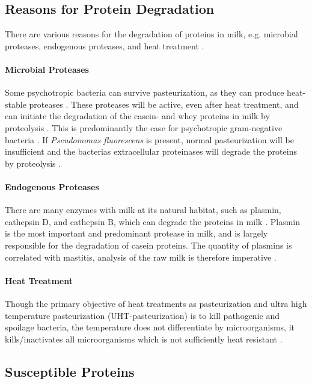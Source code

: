 \subsection{Reasons for Protein Degradation}
There are various reasons for the degradation of proteins in milk, e.g. microbial proteases, endogenous proteases, and heat treatment \cite*{a02_proteases_and_protein_degradation}. 

\paragraph*{Microbial Proteases}
    Some psychotropic bacteria can survive pasteurization, as they can produce heat-stable proteases \cite*{s01_heat_treatment_1}. These proteases will be active, even after heat treatment, and can initiate the degradation of the casein- and whey proteins in milk by proteolysis \cite*{b02_heat_induced_changes_in_milk}. This is predominantly the case for psychotropic gram-negative bacteria \cite*{s01_heat_treatment_1}.
    If \textit{Pseudomonas fluorescens} is present, normal pasteurization will be insufficient and the bacterias extracellular proteinases will degrade the proteins by proteolysis \cite*{s01_heat_treatment_1}.

\paragraph*{Endogenous Proteases}
    There are many enzymes with milk at its natural habitat, such as plasmin, cathepsin D, and cathepsin B, which can degrade the proteins in milk \cite*{a02_proteases_and_protein_degradation}. Plasmin is the most important and predominant protease in milk, and is largely responsible for the degradation of casein proteins. The quantity of plasmins is correlated with mastitis, analysis of the raw milk is therefore imperative \cite*{a02_proteases_and_protein_degradation}.

\paragraph*{Heat Treatment}
    Though the primary objective of heat treatments as pasteurization and ultra high temperature pasteurization (UHT-pasteurization) is to kill pathogenic and spoilage bacteria, the temperature does not differentiate by microorganisms, it kills/inactivates all microorganisms which is not sufficiently heat resistant \cite*{b02_heat_induced_changes_in_milk}.

\subsection{Susceptible Proteins}
